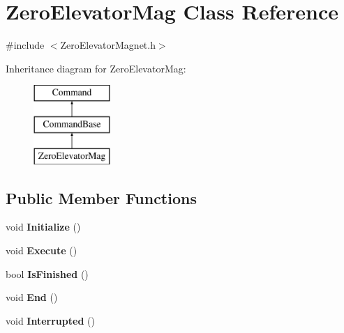 \hypertarget{class_zero_elevator_mag}{}\section{Zero\+Elevator\+Mag Class Reference}
\label{class_zero_elevator_mag}


{\ttfamily \#include $<$Zero\+Elevator\+Magnet.\+h$>$}

Inheritance diagram for Zero\+Elevator\+Mag\+:\begin{figure}[H]
\begin{center}
\leavevmode
\includegraphics[height=3.000000cm]{class_zero_elevator_mag}
\end{center}
\end{figure}
\subsection*{Public Member Functions}
\begin{DoxyCompactItemize}
\item 
\hypertarget{class_zero_elevator_mag_a02761ea43a4b9eb2b48a04964305dc26}{}void {\bfseries Initialize} ()\label{class_zero_elevator_mag_a02761ea43a4b9eb2b48a04964305dc26}

\item 
\hypertarget{class_zero_elevator_mag_a35313099fa61a059e7b753633bc81a7d}{}void {\bfseries Execute} ()\label{class_zero_elevator_mag_a35313099fa61a059e7b753633bc81a7d}

\item 
\hypertarget{class_zero_elevator_mag_a8fd0506dc8bdf6851e71a8f75cae8d4a}{}bool {\bfseries Is\+Finished} ()\label{class_zero_elevator_mag_a8fd0506dc8bdf6851e71a8f75cae8d4a}

\item 
\hypertarget{class_zero_elevator_mag_a9d284f3178c7bdb3c9208981c245a216}{}void {\bfseries End} ()\label{class_zero_elevator_mag_a9d284f3178c7bdb3c9208981c245a216}

\item 
\hypertarget{class_zero_elevator_mag_a6a911faef39aa93e64e593ce1d316e31}{}void {\bfseries Interrupted} ()\label{class_zero_elevator_mag_a6a911faef39aa93e64e593ce1d316e31}

\end{DoxyCompactItemize}
